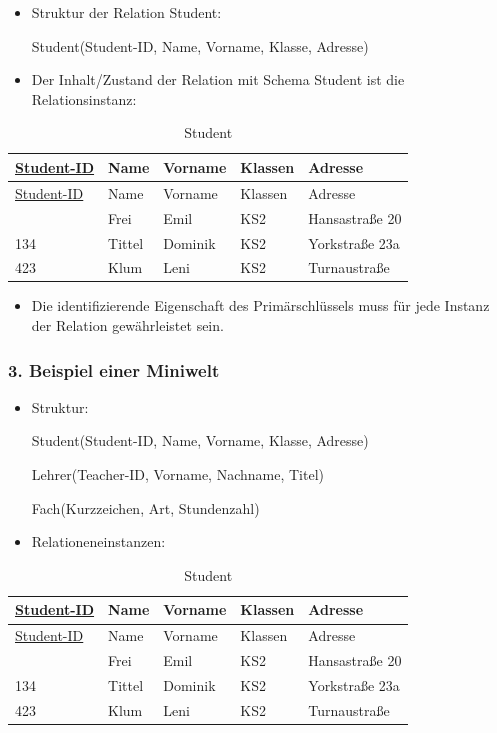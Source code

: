 \documentclass[
  11pt,
  a4paper,
  DIV=11,
  numbers=noendperiod]{scrartcl}
\providecommand{\tightlist}{%
  \setlength{\itemsep}{0pt}\setlength{\parskip}{0pt}}\usepackage{longtable,booktabs,array}
\begin{document}
\begin{itemize}
\item
  Struktur der Relation Student:

  Student(Student-ID, Name, Vorname, Klasse, Adresse)
\item
  Der Inhalt/Zustand der Relation mit Schema Student ist die
  Relationsinstanz:
\end{itemize}

\begin{longtable}[]{@{}lllll@{}}
\caption{Student}\tabularnewline
\toprule\noalign{}
\ul{Student-ID} & Name & Vorname & Klassen & Adresse \\
\midrule\noalign{}
\endfirsthead
\toprule\noalign{}
\ul{Student-ID} & Name & Vorname & Klassen & Adresse \\
\midrule\noalign{}
\endhead
\bottomrule\noalign{}
\endlastfoot
212 & Frei & Emil & KS2 & Hansastraße 20 \\
134 & Tittel & Dominik & KS2 & Yorkstraße 23a \\
423 & Klum & Leni & KS2 & Turnaustraße \\
\end{longtable}

\begin{itemize}
\tightlist
\item
  Die identifizierende Eigenschaft des Primärschlüssels muss für jede
  Instanz der Relation gewährleistet sein.
\end{itemize}

\subsubsection{3. Beispiel einer
Miniwelt}\label{beispiel-einer-miniwelt}

\begin{itemize}
\item
  Struktur:

  Student(Student-ID, Name, Vorname, Klasse, Adresse)

  Lehrer(Teacher-ID, Vorname, Nachname, Titel)

  Fach(Kurzzeichen, Art, Stundenzahl)
\item
  Relationeneinstanzen:
\end{itemize}

\begin{longtable}[]{@{}lllll@{}}
\caption{Student}\tabularnewline
\toprule\noalign{}
\ul{Student-ID} & Name & Vorname & Klassen & Adresse \\
\midrule\noalign{}
\endfirsthead
\toprule\noalign{}
\ul{Student-ID} & Name & Vorname & Klassen & Adresse \\
\midrule\noalign{}
\endhead
\bottomrule\noalign{}
\endlastfoot
212 & Frei & Emil & KS2 & Hansastraße 20 \\
134 & Tittel & Dominik & KS2 & Yorkstraße 23a \\
423 & Klum & Leni & KS2 & Turnaustraße \\
\end{longtable}
\end{document}

